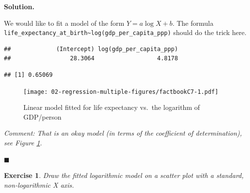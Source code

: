 \documentclass[10pt,b5paper,krantz1]{krantz}
\newenvironment{Shaded}{\begin{snugshade}}{\end{snugshade}}
\newcommand{\DataTypeTok}[1]{\textcolor[rgb]{0.27,0.27,0.27}{#1}}
\newcommand{\DecValTok}[1]{\textcolor[rgb]{0.06,0.06,0.06}{#1}}
\newcommand{\KeywordTok}[1]{\textcolor[rgb]{0.27,0.27,0.27}{\textbf{#1}}}
\newcommand{\NormalTok}[1]{#1}
\newcommand{\OperatorTok}[1]{\textcolor[rgb]{0.43,0.43,0.43}{\textbf{#1}}}
\newcommand{\StringTok}[1]{\textcolor[rgb]{0.5,0.5,0.5}{#1}}
\newtheorem{exercise}{Exercise}[chapter]
\newenvironment{solution}{%
\bigskip\noindent\textbf{Solution. }%
\it\ignorespaces%
\ignorespaces%
}{\ignorespaces%
\hfill$\blacksquare$%
}
\begin{document}
\begin{solution}

We would like to fit a model of the form \(Y=a\log X+b\).
The formula \texttt{life\_expectancy\_at\_birth\textasciitilde{}log(gdp\_per\_capita\_ppp)}
should do the trick here.

\begin{Shaded}
\end{Shaded}

\begin{verbatim}
##             (Intercept) log(gdp_per_capita_ppp) 
##                 28.3064                  4.8178
\end{verbatim}

\begin{Shaded}
\end{Shaded}

\begin{verbatim}
## [1] 0.65069
\end{verbatim}

\begin{figure}
\hypertarget{fig:factbookC7}{%
\centering
\texttt{[image: 02-regression-multiple-figures/factbookC7-1.pdf]}
\caption{Linear model fitted for life expectancy vs.~the logarithm of GDP/person}\label{fig:factbookC7}
}
\end{figure}

\emph{Comment: That is an okay model (in terms of the coefficient of determination), see Figure \ref{fig:factbookC7}.}

\end{solution}

\begin{exercise}

Draw the fitted logarithmic model on a scatter plot
with a standard, non-logarithmic X axis.

\end{exercise}
\end{document}
